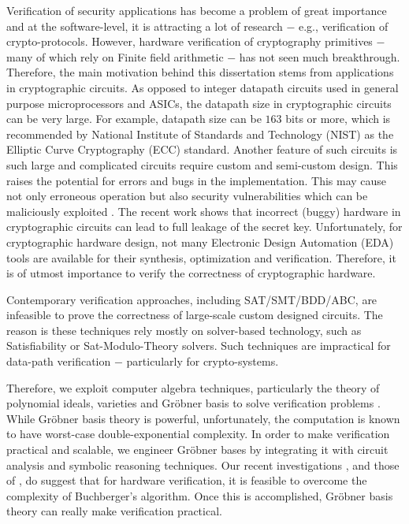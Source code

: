 Verification of security applications has become a problem of great importance
and at the software-level, it is attracting a lot of research $-$ e.g., verification of crypto-protocols. 
However, hardware verification of cryptography primitives $-$ many of which rely on Finite field arithmetic $-$
has not seen much breakthrough. 
Therefore, the main motivation behind this dissertation stems from applications in cryptographic circuits. 
As opposed to integer datapath circuits used in general purpose microprocessors and ASICs, 
the datapath size in cryptographic circuits can be very large. For example, 
datapath size can be $163$ bits or more, which is recommended by National Institute of Standards and Technology (NIST) as the 
Elliptic Curve Cryptography (ECC) standard. Another feature of such circuits is such large and complicated circuits
require custom and semi-custom design. This raises the potential for errors and bugs in the implementation. 
This may cause not only erroneous operation but also security vulnerabilities which can be maliciously exploited \cite{ms:research}. 
The recent work \cite{crypto:bug_attacks} shows that incorrect (buggy) hardware in cryptographic circuits can lead to 
full leakage of the secret key. Unfortunately, for cryptographic hardware design, not many Electronic Design
Automation (EDA) tools are available for their synthesis, optimization
and verification. Therefore, it is of utmost importance to verify
the correctness of cryptographic hardware.

Contemporary verification approaches, including SAT/SMT/BDD/ABC, are infeasible to prove the correctness of large-scale custom designed circuits. 
The reason is these techniques rely mostly on solver-based technology, such as Satisfiability or Sat-Modulo-Theory solvers. 
Such techniques are impractical for data-path verification $-$ particularly for crypto-systems.

Therefore, we exploit computer algebra techniques, particularly the theory of polynomial ideals, varieties and Gr\"obner basis to solve 
verification problems \cite{Avrunin:CAV} \cite{CEI:stoc-96} \cite{wienand:cav08}. 
While Gr\"obner basis theory is powerful, unfortunately, the computation is known to have worst-case double-exponential complexity. 
In order to make verification practical and scalable, 
we engineer Gr\"obner bases by integrating it with circuit analysis and symbolic reasoning techniques. 
Our recent investigations \cite{lv:vlsi2012} \cite{lv:date2012} \cite{lv:hldvt2011}, and those of \cite{wedler:date11}, 
do suggest that for hardware verification, 
it is feasible to overcome the complexity of Buchberger's algorithm. Once this is accomplished, Gr\"obner basis theory can 
really make verification practical.

